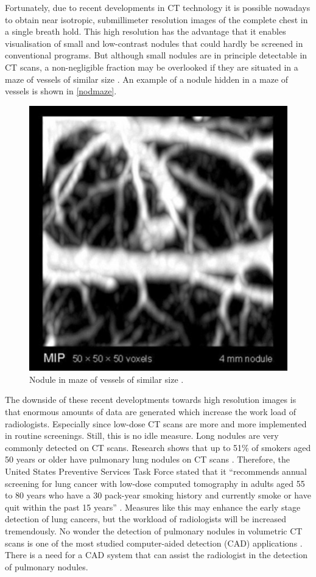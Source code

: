 Fortunately, due to recent developments in CT technology it is possible nowadays
to obtain near isotropic, submillimeter resolution images of the complete chest
in a single breath hold. This high resolution has the advantage that it enables
visualisation of small and low-contrast nodules that could hardly be screened in
conventional programs. But although small nodules are in principle detectable in
CT scans, a non-negligible fraction may be overlooked if they are situated in a
maze of vessels of similar size \cite{ozekes}. An example of a nodule hidden in
a maze of vessels is shown in \autoref{nodmaze}.
\begin{figure}[htp]
\begin{center}
  \includegraphics[width= 30 mm]{img/noduleMaze.png}
  \caption{Nodule in maze of vessels of similar size \cite{wiemkerfig}.}
  \label{nodmaze}
\end{center}
\end{figure}
The downside of these recent developtments towards high resolution images is
that enormous amounts of data are generated which increase the work load of radiologists.
Especially since low-dose CT scans are more and more implemented in routine
screenings. Still, this is no idle measure. Long nodules are very commonly
detected on CT scans. Research shows that up to 51\% of smokers aged 50 years or
older have pulmonary lung nodules on CT scans \cite{mahon}. Therefore, the
United States Preventive Services Task Force stated that it ``recommends annual
screening for lung cancer with low-dose computed tomography in adults
aged 55 to 80 years who have a 30 pack-year smoking history and currently smoke
or have quit within the past 15 years'' \cite{ups}. Measures like this may
enhance the early stage detection of lung cancers, but the workload of
radiologists will be increased tremendously. No wonder the detection of
pulmonary nodules in volumetric CT scans is one of the most studied
computer-aided detection (CAD) applications \cite{sluimer}. There is a need for
a CAD system that can assist the radiologist in the detection of pulmonary nodules.

